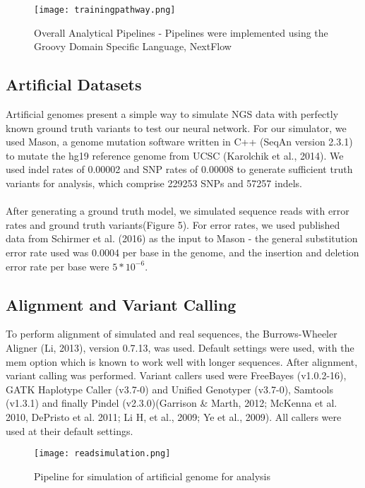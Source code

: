 \documentclass{article}
\begin{document}
\begin{figure}[H]
\texttt{[image: trainingpathway.png]}
\centering
\caption{Overall Analytical Pipelines - Pipelines were implemented using the Groovy Domain Specific Language, NextFlow}
\end{figure}

\subsection{Artificial Datasets}
Artificial genomes present a simple way to simulate NGS data with perfectly known ground truth variants to test our neural network. For our simulator, we used Mason, a genome mutation software written in C++ (SeqAn version 2.3.1) to mutate the hg19 reference genome from UCSC (Karolchik et al., 2014). We used indel rates of 0.00002 and SNP rates of 0.00008 to generate sufficient truth variants for analysis, which comprise 229253 SNPs and 57257 indels.\\\\
After generating a ground truth model, we simulated sequence reads with error rates and ground truth variants(Figure 5). For error rates, we used published data from Schirmer et al. (2016) as the input to Mason - the general substitution error rate used was 0.0004 per base in the genome, and the insertion and deletion error rate per base were $5*10^{-6}$.

\subsection{Alignment and Variant Calling} 
To perform alignment of simulated and real sequences, the Burrows-Wheeler Aligner (Li, 2013), version 0.7.13, was used. Default settings were used, with the mem option which is known to work well with longer sequences. After alignment, variant calling was performed. Variant callers used were FreeBayes (v1.0.2-16), GATK Haplotype Caller (v3.7-0) and Unified Genotyper (v3.7-0), Samtools (v1.3.1) and finally Pindel (v2.3.0)(Garrison \& Marth, 2012; McKenna et al. 2010, DePristo et al. 2011; Li H, et al., 2009; Ye et al., 2009). All callers were used at their default settings.
\begin{figure}[H]
\texttt{[image: readsimulation.png]}
\caption{Pipeline for simulation of artificial genome for analysis}
\centering
\end{figure}
\end{document}
